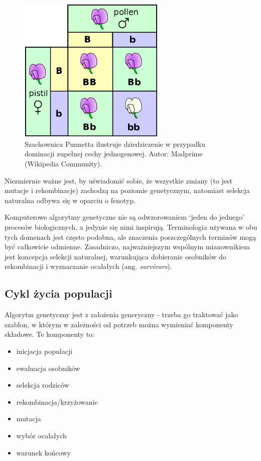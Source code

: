 \documentclass[a4paper,11pt]{article}
\begin{document}
    \bigskip

    \begin{figure}[H]
        \label{fig:punnett_squre_mendel}
        \centering
        \includegraphics[width=7cm]{punnett_squre_mendel}
        \caption{Szachownica Punnetta ilustruje dziedziczenie w przypadku dominacji zupełnej cechy jednogenowej. Autor: Madprime (Wikipedia Community).}
    \end{figure}

    \bigskip

    Niezmiernie ważne jest, by uświadomić sobie, że wszystkie zmiany (to jest mutacje i rekombinacje) zachodzą na poziomie genetycznym, natomiast selekcja naturalna odbywa się w oparciu o fenotyp\cite{IntroductionToEvolutionaryComputing2015}.

    \bigskip

    Komputerowe algorytmy genetyczne nie są odwzorowaniem `jeden do jednego' procesów biologicznych, a jedynie się nimi inspirują. Terminologia używana w obu tych domenach jest często podobna, ale znaczenia poszczególnych terminów mogą być całkowicie odmienne. Zasadniczo, najważniejszym wspólnym mianownikiem jest koncepcja selekcji naturalnej, warunkująca dobieranie osobników do rekombinacji i wyznaczanie ocalałych (ang. \textit{survivors}).

    \subsection{Cykl życia populacji}

    \noindent
    \begin{minipage}[H]{\textwidth}
        \setlength\parindent{17pt} Algorytm genetyczny jest z założenia generyczny - trzeba go traktować jako szablon, w którym w zależności od potrzeb można wymieniać komponenty składowe. Te komponenty to:
        \begin{itemize}
            \item inicjacja populacji
            \item ewaluacja osobników
            \item selekcja rodziców
            \item rekombinacja/krzyżowanie
            \item mutacja
            \item wybór ocalałych
            \item warunek końcowy
        \end{itemize}
    \end{minipage}
\end{document}
